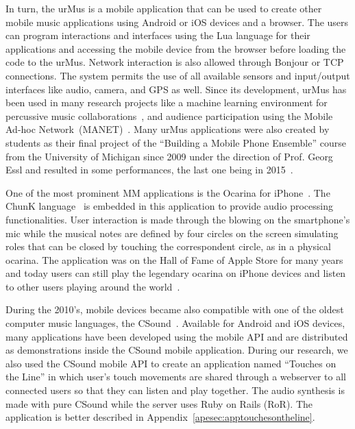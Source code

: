 In turn, the urMus is a mobile application that can be used to create other mobile music applications using Android or iOS devices and a browser.
The users can program interactions and interfaces using the Lua language for their applications and accessing the mobile device from the browser before loading the code to the urMus.
Network interaction is also allowed through Bonjour or TCP connections. 
The system permits the use of all available sensors and input/output interfaces like audio, camera, and GPS as well.
Since its development, urMus has been used in many research projects like a machine learning environment for percussive music collaborations~\citep{Derbinsky2012exploring}, and audience participation using the Mobile Ad-hoc Network~(MANET)~\citep{Lee2014manet}.
Many urMus applications were also created by students as their final project of the ``Building a Mobile Phone Ensemble'' course from the University of Michigan since 2009 under the direction of Prof. Georg Essl and resulted in some performances, the last one being in 2015~\citep{Michigan2017mobilephoneensempleperformance}.

One of the most prominent MM applications is the Ocarina for iPhone~\citep{Wang2008domobilephones}.
The ChunK language~\citep{wang2003chuck} is embedded in this application to provide audio processing functionalities.
User interaction is made through the blowing on the smartphone's mic while the musical notes are defined by four circles on the screen simulating roles that can be closed by touching the correspondent circle, as in a physical ocarina.
The application was on the Hall of Fame of Apple Store for many years and today users can still play the legendary ocarina on iPhone devices and listen to other users playing around the world~\citep{Wang2014ocarina}. 

During the 2010's, mobile devices became also compatible with one of the oldest computer music languages, the CSound~\citep{Vercoe1990csound}.
Available for Android and iOS devices, many applications have been developed using the mobile API and are distributed as demonstrations inside the CSound mobile application.
During our research, we also used the CSound mobile API to create an application named ``Touches on the Line'' in which user's touch movements are shared through a webserver to all connected users so that they can listen and play together.
The audio synthesis is made with pure CSound while the server uses Ruby on Rails (RoR).
The application is better described in Appendix~\ref{apesec:apptouchesontheline}.

